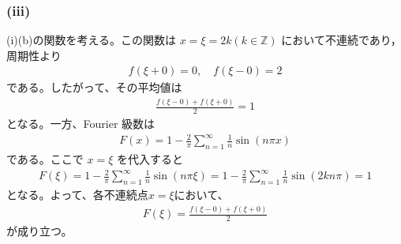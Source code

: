 \documentclass[platex,dvipdfmx,a4paper]{jsarticle}
\begin{document}
  \subsubsection*{(iii)}
  (i)(b)の関数を考える。この関数は $x=\xi=2k(k \in \mathbb{Z})$ において不連続であり，周期性より
  \begin{align*}
    f(\xi+0)=0, \quad f(\xi-0)=2
  \end{align*}
  である。したがって、その平均値は
  \begin{align*}
    \frac{f(\xi-0)+f(\xi+0)}{2}=1
  \end{align*}
  となる。一方、Fourier 級数は
  \begin{align*}
    F(x)=1-\frac{2}{\pi}\sum_{n=1}^{\infty}\frac{1}{n}\sin(n\pi x)
  \end{align*}
  である。ここで $x=\xi$ を代入すると
  \begin{align*}
    F(\xi)=1-\frac{2}{\pi}\sum_{n=1}^{\infty}\frac{1}{n}\sin(n\pi \xi)=1-\frac{2}{\pi}\sum_{n=1}^{\infty}\frac{1}{n}\sin(2kn\pi)=1
  \end{align*}
  となる。よって、各不連続点$x=\xi$において、
  \begin{align*}
    F(\xi)=\frac{f(\xi-0)+f(\xi+0)}{2}
  \end{align*}
  が成り立つ。
  
  
\end{document}
